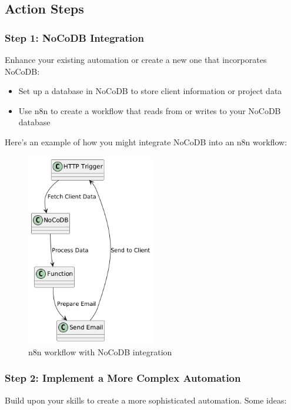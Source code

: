 \subsection{Action Steps}

\subsubsection{Step 1: NoCoDB Integration}
Enhance your existing automation or create a new one that incorporates NoCoDB:

\begin{itemize}
    \item Set up a database in NoCoDB to store client information or project data
    \item Use n8n to create a workflow that reads from or writes to your NoCoDB database
\end{itemize}

Here's an example of how you might integrate NoCoDB into an n8n workflow:

\begin{figure}[H]
    \centering
    \includegraphics[width=0.5\textwidth]{figures/09-n8n-with-budibase}
    \caption{n8n workflow with NoCoDB integration}
    \label{fig:n8n-with-budibase}
\end{figure}


\subsubsection{Step 2: Implement a More Complex Automation}
Build upon your skills to create a more sophisticated automation. Some ideas:

